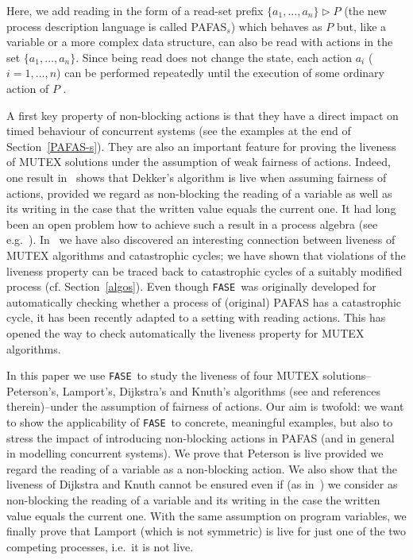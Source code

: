 \documentclass[copyright,creativecommons]{eptcs}
\newcommand{\fase}{\texttt{FASE}}
\newcommand{\rop}{\triangleright}
\begin{document}
Here, we add reading in the form of a read-set prefix $\{a_1, \ldots, a_n\}
\rop P$ (the new process description language is called PAFAS$_s$) which
behaves as $P$ but, like a variable or a more complex data structure, can
also be read with actions in the set $\{a_1, \ldots, a_n\}$. Since being
read does not change the state, each action $a_i$ ($i=1,\ldots,n$) can be
performed repeatedly until the execution of some ordinary action of $P$ .


A first key property of non-blocking actions is that they have a direct
impact on timed behaviour of concurrent systems (see the examples at the
end of Section~\ref{PAFAS-s}). They are also an important feature for
proving the liveness of MUTEX solutions under the assumption of weak
fairness of actions. Indeed, one result in~\cite{CDV08tr} shows that
Dekker's algorithm is live when assuming fairness of actions, provided we
regard as non-blocking the reading of a variable as well as its writing in
the case that the written value equals the current one. It had long been an
open problem how to achieve such a result in a process algebra (see
e.g.~\cite{Walker89}). In~\cite{CDV08tr} we have also discovered an
interesting connection between liveness of MUTEX algorithms and
catastrophic cycles; we have shown that violations of the liveness property
can be traced back to catastrophic cycles of a suitably modified process
(cf. Section~\ref{algos}). Even though \fase\ was originally developed for
automatically checking whether a process of (original) PAFAS has a
catastrophic cycle, it has been recently adapted to a setting with reading
actions. This has opened the way to check automatically the liveness
property for MUTEX algorithms.

In this paper we use \fase\ to study the liveness of four MUTEX
solutions--Peterson's, Lamport's, Dijkstra's and Knuth's algorithms (see
\cite{Walker89} and references therein)--under the assumption of
fairness of actions. Our aim is twofold: we want to show the applicability
of \fase\ to  concrete, meaningful examples, but also to stress the
impact of introducing non-blocking actions in PAFAS (and in general in
modelling concurrent systems). We prove that Peterson is live provided we
regard the reading of a variable as a non-blocking action. We also show
that the liveness of Dijkstra and Knuth cannot be ensured even if (as
in~\cite{CDV08tr}) we consider as non-blocking the reading of a variable
and its writing in the case the written value equals the current one. With
the same assumption on program variables, we finally prove that Lamport
(which is not symmetric) is live for just one of the two competing
processes, i.e.\ it is not live. 
\end{document}

